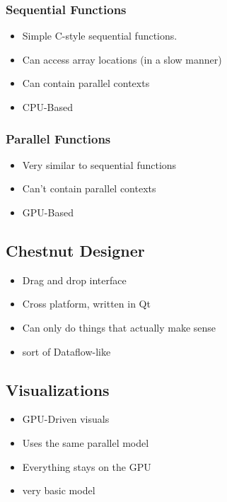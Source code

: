 \subsubsection{Sequential Functions}

\begin{itemize}
\item Simple C-style sequential functions.
\item Can access array locations (in a slow manner)
\item Can contain parallel contexts
\item CPU-Based
\end{itemize}

\subsubsection{Parallel Functions}

\begin{itemize}
\item Very similar to sequential functions
\item Can't contain parallel contexts
\item GPU-Based
\end{itemize}

\subsection{Chestnut Designer}

\begin{itemize}
\item Drag and drop interface
\item Cross platform, written in Qt
\item Can only do things that actually make sense
\item sort of Dataflow-like
\end{itemize}

\subsection{Visualizations}

\begin{itemize}
\item GPU-Driven visuals
\item Uses the same parallel model
\item Everything stays on the GPU
\item very basic model
\end{itemize}

